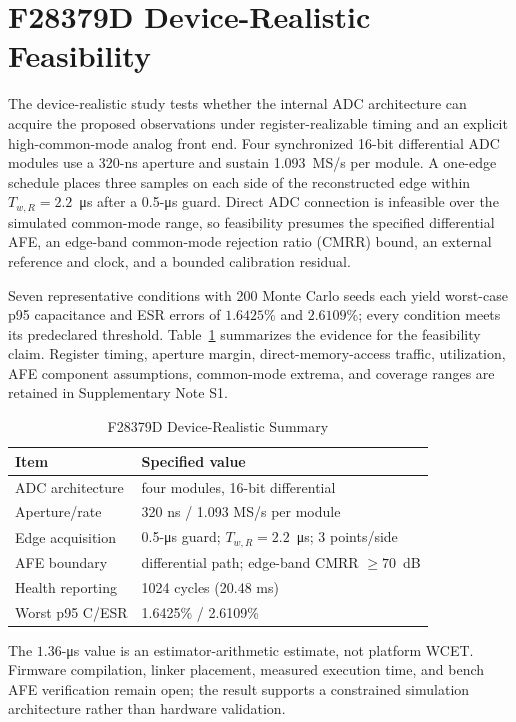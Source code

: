 ﻿\section{F28379D Device-Realistic Feasibility}
\label{sec:device}

The device-realistic study tests whether the internal ADC architecture can acquire the proposed observations under register-realizable timing and an explicit high-common-mode analog front end. Four synchronized 16-bit differential ADC modules use a 320-ns aperture and sustain 1.093~MS/s per module. A one-edge schedule places three samples on each side of the reconstructed edge within $T_{w,R}=2.2$~\si{\micro\second} after a 0.5-\si{\micro\second} guard. Direct ADC connection is infeasible over the simulated common-mode range, so feasibility presumes the specified differential AFE, an edge-band common-mode rejection ratio (CMRR) bound, an external reference and clock, and a bounded calibration residual.

Seven representative conditions with 200 Monte Carlo seeds each yield worst-case p95 capacitance and ESR errors of $1.6425\%$ and $2.6109\%$; every condition meets its predeclared threshold. Table~\ref{tab:f28379d} summarizes the evidence for the feasibility claim. Register timing, aperture margin, direct-memory-access traffic, utilization, AFE component assumptions, common-mode extrema, and coverage ranges are retained in Supplementary Note S1.

\begin{table}[t]
\caption{F28379D Device-Realistic Summary}
\label{tab:f28379d}
\centering
\footnotesize
\begin{tabular}{ll}
\toprule
Item & Specified value \\
\midrule
ADC architecture & four modules, 16-bit differential \\
Aperture/rate & 320 ns / 1.093 MS/s per module \\
Edge acquisition & 0.5-\si{\micro\second} guard; $T_{w,R}=2.2$~\si{\micro\second}; 3 points/side \\
AFE boundary & differential path; edge-band CMRR $\ge70$~dB \\
Health reporting & 1024 cycles (20.48 ms) \\
Worst p95 C/ESR & 1.6425\% / 2.6109\% \\
\bottomrule
\end{tabular}
\end{table}

The $1.36$-\si{\micro\second} \TSRLS{} value is an estimator-arithmetic estimate, not platform WCET. Firmware compilation, linker placement, measured execution time, and bench AFE verification remain open; the result supports a constrained simulation architecture rather than hardware validation.


